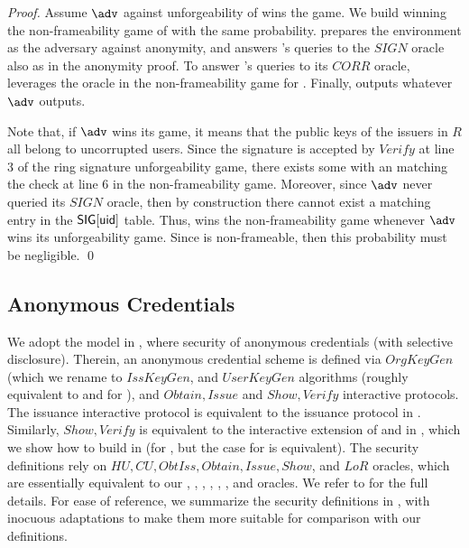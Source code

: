 \begin{proof}
  Assume $\adv$ against unforgeability of \CUASRing wins the game. We build
  \advB winning the non-frameability game of \CUASGen with the same probability.
  \advB prepares the environment as the adversary \advB against anonymity,
  and answers \adv's queries to the $SIGN$ oracle also as in the anonymity
  proof. To answer \adv's queries to its $CORR$ oracle, \advB leverages the
  \ICORR oracle in the non-frameability game for \UAS. Finally, \advB outputs
  whatever $\adv$ outputs.

  Note that, if $\adv$ wins its game, it means that the public keys of the
  issuers in $R$ all belong to uncorrupted users. Since the signature is
  accepted by $Verify$ at line 3 of the ring signature unforgeability game,
  there exists some \uid with an \usk matching the check at line 6 in the
  non-frameability game. Moreover, since $\adv$ never queried its $SIGN$
  oracle, then by construction there cannot exist a matching entry in the
  $\mathsf{SIG}[\mathsf{uid}]$ table. Thus, \advB wins the non-frameability game whenever
  $\adv$ wins its unforgeability game. Since \CUASGen is non-frameable, then
  this probability must be negligible.
  \qed
\end{proof}

\subsection{Anonymous Credentials}
\label{sapp:related-models-ac}

We adopt the model in \cite{fhs19}, where security of anonymous credentials
(with selective disclosure). Therein, an anonymous credential scheme is
defined via $OrgKeyGen$ (which we rename to $IssKeyGen$, and $UserKeyGen$
algorithms (roughly equivalent to
\IKeyGen and \UKeyGen for \UAS), and $Obtain,Issue$ and $Show,Verify$
interactive protocols. The issuance interactive protocol is equivalent to
the issuance protocol in \UAS. Similarly, $Show,Verify$ is equivalent to
the interactive extension of \Sign and \Verify in \UAS, which we show how
to build in  (for \GSAC, but the case for \UAS is
equivalent). The security definitions rely on $HU, CU, ObtIss, Obtain, Issue,
Show$, and $LoR$ oracles, which are essentially equivalent to our \HUGEN,
\CUGEN, \OBTISS, \OBTAIN, \ISSUE, \SIGN, and \CHALb oracles. We refer to
\cite{fhs19} for the full details. For ease of reference, we summarize the
security definitions in \cite{fig:model-ac}, with inocuous adaptations to
make them more suitable for comparison with our definitions.

